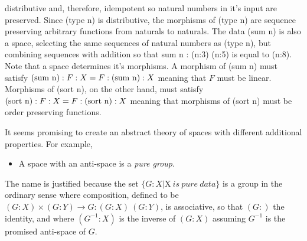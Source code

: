 \documentclass[11pt]{article}
\begin{document}
distributive and, therefore, idempotent so natural numbers in it's input are preserved.
Since (type n) is distributive, the morphisms
of (type n) are sequence preserving arbitrary functions from naturals to naturals.
The data (sum n) is also a space, selecting the same sequences of  natural numbers as (type n), but combining
sequences with addition so that sum n : (n:3) (n:5) is equal to (n:8).  Note that a space determines it's morphisms.
A morphism of (sum n) must satisfy $({\rm sum\ n}):F:X = F:({\rm sum\ n}):X$ meaning that $F$ must be linear.
Morphisms of (sort n), on the other hand, must satisfy $({\rm sort\ n}):F:X=F:({\rm sort\ n}):X$ meaning that
morphisms of (sort n) must be order preserving functions.

     It seems promising to create an abstract theory of spaces with different additional properties.  For
 example,
\begin{itemize}
\item A space with an anti-space is a {\it pure group}.
\end{itemize}
The name is justified because the set $\{G:X | $X$\ is\ pure\ data\}$
is a group in the ordinary sense where composition, defined to be $(G:X)\times(G:Y)\rightarrow G:(G:X)\ (G:Y)$, is associative, so that
$(G:)$ the identity, and where $(G^{-1}:X)$ is the inverse of $(G:X)$ assuming $G^{-1}$ is the promised anti-space of $G$.
\end{document}
